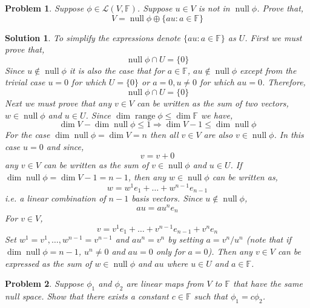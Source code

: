 \documentclass[11pt,a4paper]{scrartcl}
\DeclareMathOperator{\range}{range}
\DeclareMathOperator{\nspace}{null}
\newcommand{\lmap}[2]{\mathcal{L}(#1,#2)}
\theoremstyle{solve}
\newtheorem{problem}{Problem}
\newtheorem*{solution}{Solution}
\begin{document}
\begin{problem}
    Suppose $\phi\in\lmap{V}{\mathbb{F}}$. Suppose $u\in V$
    is not in $\nspace \phi$. Prove that,
    \[
        V = \nspace \phi \oplus \{au: a \in \mathbb{F} \}
    \]
\end{problem}   
\begin{solution}
    To simplify the expressions denote
    $\{au: a \in \mathbb{F} \}$ as $U$.
    First we must prove that,
    \[
    \nspace \phi  \cap U
    =
    \{0\}
    \]
    Since $u \notin \nspace \phi$ it is also the case
    that for $a \in \mathbb{F}$, $au \notin \nspace \phi$
    except from the trivial case $u=0$ for which $U=\{0\}$
    or $a=0, u\neq 0$ for which $au=0$. Therefore,
    \[
    \nspace \phi \cap
    U =
    \{0\}
    \]
    Next we must prove that any $v\in V$ can be written
    as the sum of two vectors, $w \in \nspace \phi$
    and $u \in U$. Since
    $\dim \range \phi \leq \dim \mathbb{F}$ we have,
    \[
    \dim V - \dim \nspace \phi \leq 1
    \Rightarrow
    \dim V -1 \leq \dim \nspace \phi
    \]
    For the case $\dim \nspace \phi=\dim V=n$ then
    all $v \in V$ are also $v \in \nspace \phi$. In this case
    $u=0$ and since,
    \[
    v = v+0
    \]
    any $v\in V$ can be written as the sum of
    $v \in \nspace \phi$ and $u \in U$.
    If $\dim \nspace \phi=\dim V-1=n-1$, then any
    $w \in \nspace \phi$ can be written as,
    \[
    w = w^1 e_1 + \ldots + w^{n-1} e_{n-1}
    \]
    i.e. a linear combination of $n-1$ basis vectors. Since
    $u \notin \nspace \phi$,
    \[
    au = a u^n e_n
    \]
    For $v \in V$,
    \[
    v = v^1 e_1 + \ldots + v^{n-1} e_{n-1} + v^n e_n
    \]
    Set $w^1=v^1,\ldots,w^{n-1}=v^{n-1}$ and
    $a u^n=v^n$ by setting $a=v^n/u^n$ (note that if 
    $\dim \nspace \phi=n-1$,
    $u^n \neq 0$ and $au=0$ only for $a=0$). Then any $v \in V$ can be expressed as the
    sum of $w \in \nspace \phi$ and $au$ where $u \in U$ 
    and $a \in \mathbb{F}$.
\end{solution}
\begin{problem}
    Suppose $\phi_1$ and $\phi_2$ are linear maps from
    $V$ to $\mathbb{F}$ that have the same null space.
    Show that there exists a constant $c\in \mathbb{F}$
    such that $\phi_1=c\phi_2$.
\end{problem}
\end{document}
